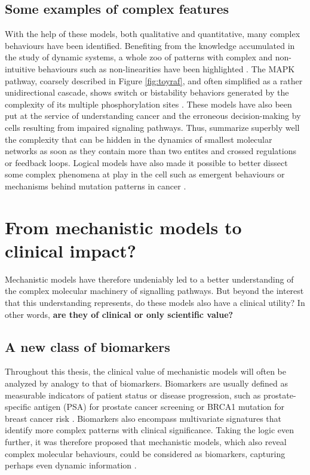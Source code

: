 \documentclass[a4paper,12pt,twoside,onecolumn,openright,final,oldfontcommands]{memoir}
\begin{document}
\subsection{Some examples of complex
features}\label{some-examples-of-complex-features}

With the help of these models, both qualitative and quantitative, many
complex behaviours have been identified. Benefiting from the knowledge
accumulated in the study of dynamic systems, a whole zoo of patterns
with complex and non-intuitive behaviours such as non-linearities have
been highlighted \citep{tyson2003sniffers}. The MAPK pathway, coarsely
described in Figure \ref{fig:toyraf}, and often simplified as a rather
unidirectional cascade, shows switch or bistability behaviors generated
by the complexity of its multiple phosphorylation sites
\citep{markevich2004signaling}. These models have also been put at the
service of understanding cancer and the erroneous decision-making by
cells resulting from impaired signaling pathways. Thus,
\citet{tyson2011dynamic} summarize superbly well the complexity that can
be hidden in the dynamics of smallest molecular networks as soon as they
contain more than two entites and crossed regulations or feedback loops.
Logical models have also made it possible to better dissect some complex
phenomena at play in the cell such as emergent behaviours
\citep{helikar2008emergent} or mechanisms behind mutation patterns in
cancer \citep{remy2015modeling}.

\section{From mechanistic models to clinical
impact?}\label{from-mechanistic-models-to-clinical-impact}

Mechanistic models have therefore undeniably led to a better
understanding of the complex molecular machinery of signalling pathways.
But beyond the interest that this understanding represents, do these
models also have a clinical utility? In other words, \textbf{are they of
clinical or only scientific value?}

\subsection{A new class of biomarkers}\label{a-new-class-of-biomarkers}

Throughout this thesis, the clinical value of mechanistic models will
often be analyzed by analogy to that of biomarkers. Biomarkers are
usually defined as measurable indicators of patient status or disease
progression, such as prostate-specific antigen (PSA) for prostate cancer
screening or BRCA1 mutation for breast cancer risk
\citep{henry2012cancer}. Biomarkers also encompass multivariate
signatures that identify more complex patterns with clinical
significance. Taking the logic even further, it was therefore proposed
that mechanistic models, which also reveal complex molecular behaviours,
could be considered as biomarkers, capturing perhaps even dynamic
information \citep{fey2015signaling}.
\end{document}
